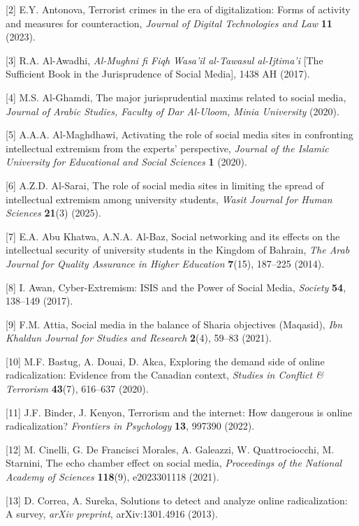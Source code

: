 \documentclass[11pt,a4paper]{article}
\begin{document}
	[2] E.Y. Antonova, Terrorist crimes in the era of digitalization: Forms of activity and measures for counteraction, \textit{Journal of Digital Technologies and Law} \textbf{11} (2023).
	
	[3] R.A. Al-Awadhi, \textit{Al-Mughni fi Fiqh Wasa'il al-Tawasul al-Ijtima'i} [The Sufficient Book in the Jurisprudence of Social Media], 1438 AH (2017).
	
	[4] M.S. Al-Ghamdi, The major jurisprudential maxims related to social media, \textit{Journal of Arabic Studies, Faculty of Dar Al-Uloom, Minia University} (2020).
	
	[5] A.A.A. Al-Maghdhawi, Activating the role of social media sites in confronting intellectual extremism from the experts' perspective, \textit{Journal of the Islamic University for Educational and Social Sciences} \textbf{1} (2020).
	
	[6] A.Z.D. Al-Sarai, The role of social media sites in limiting the spread of intellectual extremism among university students, \textit{Wasit Journal for Human Sciences} \textbf{21}(3) (2025).
	
	[7] E.A. Abu Khatwa, A.N.A. Al-Baz, Social networking and its effects on the intellectual security of university students in the Kingdom of Bahrain, \textit{The Arab Journal for Quality Assurance in Higher Education} \textbf{7}(15), 187--225 (2014).
	
	[8] I. Awan, Cyber-Extremism: ISIS and the Power of Social Media, \textit{Society} \textbf{54}, 138--149 (2017).
	
	[9] F.M. Attia, Social media in the balance of Sharia objectives (Maqasid), \textit{Ibn Khaldun Journal for Studies and Research} \textbf{2}(4), 59--83 (2021).
	
	[10] M.F. Bastug, A. Douai, D. Akca, Exploring the demand side of online radicalization: Evidence from the Canadian context, \textit{Studies in Conflict \& Terrorism} \textbf{43}(7), 616--637 (2020).
	
	[11] J.F. Binder, J. Kenyon, Terrorism and the internet: How dangerous is online radicalization? \textit{Frontiers in Psychology} \textbf{13}, 997390 (2022).
	
	[12] M. Cinelli, G. De Francisci Morales, A. Galeazzi, W. Quattrociocchi, M. Starnini, The echo chamber effect on social media, \textit{Proceedings of the National Academy of Sciences} \textbf{118}(9), e2023301118 (2021).
	
	[13] D. Correa, A. Sureka, Solutions to detect and analyze online radicalization: A survey, \textit{arXiv preprint}, arXiv:1301.4916 (2013).
	
\end{document}
